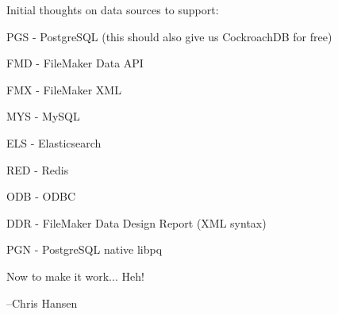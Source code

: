 Initial thoughts on data sources to support\+:
\begin{DoxyItemize}
\item {\ttfamily P\+GS} -\/ Postgre\+S\+QL (this should also give us Cockroach\+DB for free)
\item {\ttfamily F\+MD} -\/ File\+Maker Data A\+PI
\item {\ttfamily F\+MX} -\/ File\+Maker X\+ML
\item {\ttfamily M\+YS} -\/ My\+S\+QL
\item {\ttfamily E\+LS} -\/ Elasticsearch
\item {\ttfamily R\+ED} -\/ Redis
\item {\ttfamily O\+DB} -\/ O\+D\+BC
\item {\ttfamily D\+DR} -\/ File\+Maker Data Design Report (X\+ML syntax)
\item {\ttfamily P\+GN} -\/ Postgre\+S\+QL native libpq
\end{DoxyItemize}

Now to make it work... Heh!

--Chris Hansen 